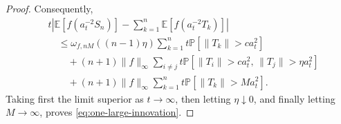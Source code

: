 \documentclass[10pt,a4paper]{amsart}
\newcommand{\Ebb}{\mathbb{E}}  %
\newcommand{\Pbb}{\mathbb{P}}
\newcommand{\Tbf}{{ T}}
\begin{document}
\begin{proof}
    Consequently,
    \begin{align*}
      &t\left|
        \Ebb[f(a_t^{-2}S_n)]
        -
        \sum_{k=1}^n\Ebb[f(a_t^{-2}\Tbf_{k})]
      \right| \\
      &\quad\leq
      \omega_{f,nM}((n-1)\eta)
      \sum_{k=1}^n
      t\Pbb[\|\Tbf_k\|>c a_t^2] \\
      &\qquad+
      (n+1)\|f\|_\infty
      \sum_{i\neq j}
      t\Pbb\left[
        \|\Tbf_i\|>c a_t^2,\,
        \|\Tbf_j\|>\eta a_t^2
      \right] \\
      &\qquad+
      (n+1)\|f\|_\infty
      \sum_{k=1}^n
      t\Pbb[\|\Tbf_k\|>M a_t^2].
    \end{align*}
    Taking first the limit superior as $t\to\infty$, then letting
    $\eta\downarrow0$, and finally letting $M\to\infty$, proves \eqref{eq:one-large-innovation}.
  \end{proof}
\end{document}
